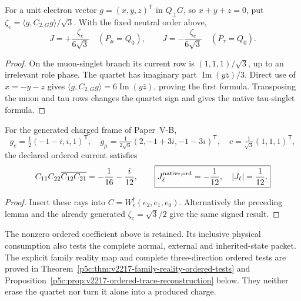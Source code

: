 \documentclass[12pt,a4paper]{article}
\begin{document}
\begin{lemma}
\label{p5c:lem:v2167-ordered-branch-signs}
For a unit electron vector $g=(x,y,z)^{\mathsf T}$ in $Q_\perp G$, so
$x+y+z=0$, put $\zeta_e=\langle g,C_{2,G}g\rangle/\sqrt3$.
With the fixed neutral order above,
\[
 J=+\frac{\zeta_e}{6\sqrt3}\quad(P_\mu=Q_0),\qquad
 J=-\frac{\zeta_e}{6\sqrt3}\quad(P_\tau=Q_0).
\]
\end{lemma}
\begin{proof}
On the muon-singlet branch its current row is $(1,1,1)/\sqrt3$, up to an
irrelevant role phase. The quartet has imaginary part
$\operatorname{Im}(y\bar z)/3$. Direct use of $x=-y-z$ gives
$\langle g,C_{2,G}g\rangle=6\operatorname{Im}(y\bar z)$,
proving the first formula. Transposing the muon and tau rows changes the
quartet sign and gives the native tau-singlet formula.
\end{proof}

\begin{corollary}
\label{p5c:cor:v2167-literal-current-quartet}
For the generated charged frame of Paper~V-B,
\[
 g_e=\tfrac12(-1-i,i,1)^{\mathsf T},\quad
 g_\mu=\tfrac1{2\sqrt6}(2,-1+3i,-1-3i)^{\mathsf T},\quad
 c=\tfrac1{\sqrt3}(1,1,1)^{\mathsf T},
\]
the declared ordered current satisfies
\[
 C_{11}C_{22}\overline{C_{12}C_{21}}
 =-\frac1{16}-\frac i{12},\qquad
 \boxed{J_\ell^{\rm native,ord}=-\frac1{12},\quad |J_\ell|=\frac1{12}.}
\]
\end{corollary}
\begin{proof}
Insert these rays into $C=W_e^\dagger(e_2,e_1,e_0)$.
Alternatively the preceding lemma and the already generated
$\zeta_e=\sqrt3/2$ give the same signed result.
\end{proof}

\begin{remark}
\label{p5c:rem:v2217-quartet-inclusive-test}
The nonzero ordered coefficient above is retained. Its inclusive physical
consumption also tests the complete normal, external and inherited-state
packet. The explicit family reality map and complete three-direction
ordered tests are proved in
Theorem~\ref{p5c:thm:v2217-family-reality-ordered-tests} and
Proposition~\ref{p5c:prop:v2217-ordered-trace-reconstruction} below.
They neither erase the quartet nor turn it alone into a produced charge.
\end{remark}
\end{document}
